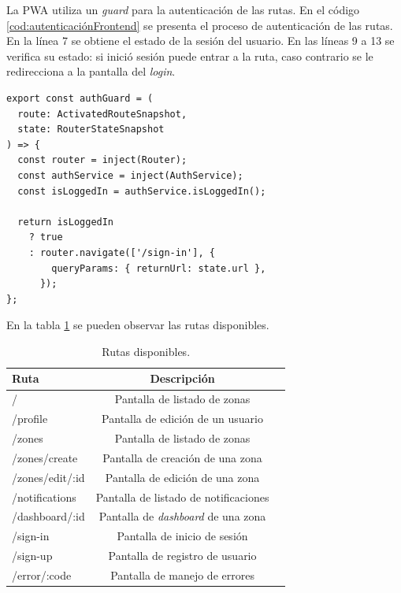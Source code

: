La PWA utiliza un \emph{guard} para la autenticación de las rutas.  En el código \ref{cod:autenticaciónFrontend} se presenta el proceso de autenticación de las rutas. En la línea 7 se obtiene el estado de la sesión del usuario. En las líneas 9 a 13 se verifica su estado: si inició sesión puede entrar a la ruta, caso contrario se le redirecciona a la pantalla del \emph{login}.

\begin{lstlisting}[label=cod:autenticaciónFrontend,caption=Autenticación de rutas.]
export const authGuard = (
  route: ActivatedRouteSnapshot,
  state: RouterStateSnapshot
) => {
  const router = inject(Router);
  const authService = inject(AuthService);
  const isLoggedIn = authService.isLoggedIn();

  return isLoggedIn
    ? true
    : router.navigate(['/sign-in'], {
        queryParams: { returnUrl: state.url },
      });
};
\end{lstlisting} 

En la tabla \ref{tab:tablaRutasFrontend} se pueden observar las rutas disponibles.

\begin{table}[H]
	\centering
	\caption[Rutas disponibles]{Rutas disponibles.}
	\begin{tabular}{l c c}    
		\toprule
		\textbf{Ruta}& \textbf{Descripción}\\
		\midrule
		/ & Pantalla de listado de zonas \\
		/profile & Pantalla de edición de un usuario \\
		/zones & Pantalla de listado de zonas \\
		/zones/create & Pantalla de creación de una zona \\
		/zones/edit/:id & Pantalla de edición de una zona \\
		/notifications & Pantalla de listado de notificaciones \\
		/dashboard/:id & Pantalla de \emph{dashboard} de una zona \\
		/sign-in & Pantalla de inicio de sesión \\
		/sign-up & Pantalla de registro de usuario \\
		/error/:code & Pantalla de manejo de errores \\
		\bottomrule
		\hline
	\end{tabular}
	\label{tab:tablaRutasFrontend}
\end{table}

